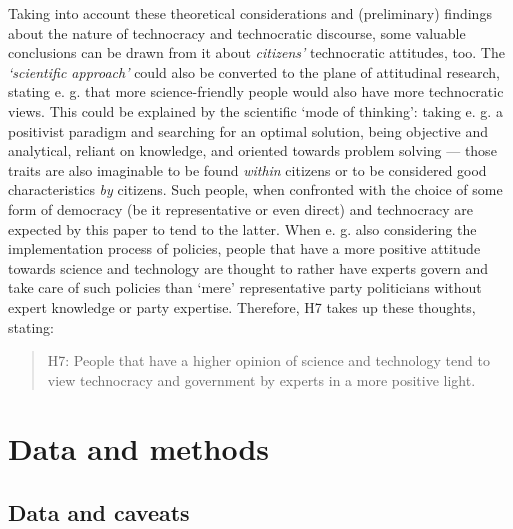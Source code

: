 \documentclass[
  12pt,
  english,
]{article}
\begin{document}
Taking into account these theoretical considerations and (preliminary)
findings about the nature of technocracy and technocratic discourse,
some valuable conclusions can be drawn from it about \emph{citizens'}
technocratic attitudes, too. The \emph{`scientific approach'} could also
be converted to the plane of attitudinal research, stating e. g. that
more science-friendly people would also have more technocratic views.
This could be explained by the scientific `mode of thinking': taking e.
g. a positivist paradigm and searching for an optimal solution, being
objective and analytical, reliant on knowledge, and oriented towards
problem solving --- those traits are also imaginable to be found
\emph{within} citizens or to be considered good characteristics
\emph{by} citizens. Such people, when confronted with the choice of some
form of democracy (be it representative or even direct) and technocracy
are expected by this paper to tend to the latter. When e. g. also
considering the implementation process of policies, people that have a
more positive attitude towards science and technology are thought to
rather have experts govern and take care of such policies than `mere'
representative party politicians without expert knowledge or party
expertise. Therefore, H7 takes up these thoughts, stating:

\begin{quote}
H7: People that have a higher opinion of science and technology tend to
view technocracy and government by experts in a more positive light.
\end{quote}

\newpage{}

\hypertarget{data-and-methods}{%
\section{Data and methods}\label{data-and-methods}}

\hypertarget{data-and-caveats}{%
\subsection{Data and caveats}\label{data-and-caveats}}
\end{document}
